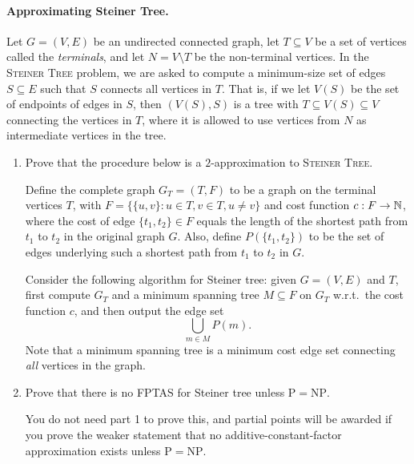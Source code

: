 \paragraph{Approximating Steiner Tree.}
Let $G = (V,E)$ be an undirected connected graph, let $T \subseteq V$ be a set of
vertices called the \emph{terminals}, and let $N = V \setminus T$ be the
non-terminal vertices. In the \textsc{Steiner Tree} problem, we are asked to
compute a minimum-size set of edges $S \subseteq E$ such that $S$ connects all
vertices in $T$. That is, if we let $V(S)$ be the set of endpoints of edges in
$S$, then $(V(S),S)$ is a tree with $T \subseteq V(S) \subseteq V$ connecting the
vertices in $T$, where it is allowed to use vertices from $N$ as intermediate
vertices in the tree.
\begin{enumerate}
  \item Prove that the procedure below is a $2$-approximation to \textsc{Steiner
        Tree}.

        Define the complete graph $G_T = (T,F)$ to be a graph on the terminal
        vertices $T$, with $F = \{\{u,v\} : u \in T, v \in T, u \ne v\}$ and cost
        function $c : F \to \mathbb{N}$, where the cost of edge $\{t_1,t_2\} \in F$
        equals the length of the shortest path from $t_1$ to $t_2$ in the
        original graph $G$. Also, define $P(\{t_1,t_2\})$ to be the set of edges
        underlying such a shortest path from $t_1$ to $t_2$ in $G$.

        Consider the following algorithm for Steiner tree: given $G = (V,E)$ and
        $T$, first compute $G_T$ and a minimum spanning tree $M \subseteq F$ on
        $G_T$ w.r.t.\ the cost function $c$, and then output the edge set
        \[ \bigcup_{m \in M} P(m). \]
        Note that a minimum spanning tree is a minimum cost edge set connecting
        \emph{all} vertices in the graph.
  \item Prove that there is no FPTAS for Steiner tree unless
        $\mathrm{P} = \mathrm{NP}$.

        You do not need part 1 to prove this, and partial points will be awarded
        if you prove the weaker statement that no additive-constant-factor
        approximation exists unless $\mathrm{P} = \mathrm{NP}$.
\end{enumerate}

